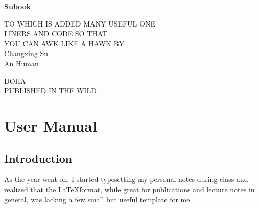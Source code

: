 \documentclass[]{subook}
\begin{document}
\pagestyle{empty}
\setcounter{page}{0}



\begin{center}
\bfseries
\nbvspace[1]
\Huge
{\nbtitlestretch\huge
Subook}

\nbvspace[1]
\normalsize

TO WHICH IS ADDED MANY USEFUL ONE\\
LINERS AND CODE SO THAT\\
YOU CAN AWK LIKE A HAWK
\nbvspace[1]
\small BY\\
\Large Changxing Su\\[0.5em]
\footnotesize An Human 

\nbvspace[2]

\nbvspace[3]
\normalsize

DOHA\\
\large
PUBLISHED IN THE WILD
\nbvspace[1]
\end{center}

\dominitoc%


\tableofcontents %


\restoregeometry

\pagestyle{fancy} %
\part{User Manual}

\chapter{Introduction}
\minitoc
As the year went on, I started typesetting my personal notes during class and realized that the \LaTeX  format, 
while great for publications and lecture notes in general, was lacking a few small but useful template for me.
\end{document}

